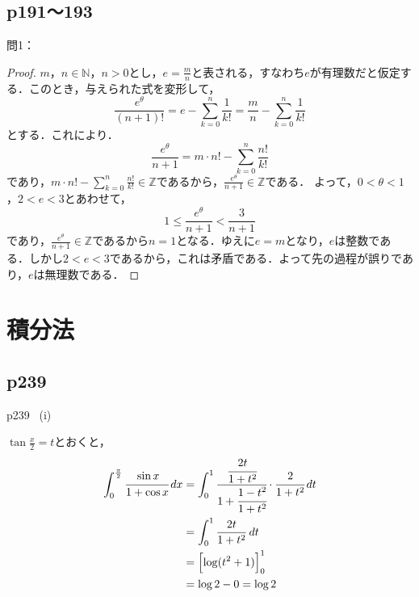 \documentclass[dvipdfmx,uplatex,11pt]{jsarticle}
\theoremstyle{definition}
\begin{document}
\subsection{p191〜193}
%
問1：
\begin{leftbar}
    \begin{proof}
        $m，n \in \mathbb{N}$，$n >0$とし，$e=\frac{m}{n}$と表される，すなわち$e$が有理数だと仮定する．このとき，与えられた式を変形して，
        \[
            \frac{e^\theta}{(n+1)!} = e-\sum_{k=0}^{n} \frac{1}{k!} =\frac{m}{n}-\sum_{k=0}^{n} \frac{1}{k!}
        \]
        とする．これにより．
        \[
            \frac{e^{\theta}}{n+1} = m \cdot n! - \sum_{k=0}^{n} \frac{n!}{k!}
        \]
        であり，$m \cdot n! - \sum_{k=0}^{n} \frac{n!}{k!} \in \mathbb{Z}$であるから，$\frac{e^{\theta}}{n+1} \in \mathbb{Z}$である．
        よって，$0< \theta <1$，$2<e<3$とあわせて，
        \[
            1 \le \frac{e^{\theta}}{n+1} < \frac{3}{n+1}
        \]
        であり，$\frac{e^{\theta}}{n+1} \in \mathbb{Z}$であるから$n=1$となる．ゆえに$e=m$となり，$e$は整数である．しかし$2<e<3$であるから，これは矛盾である．よって先の過程が誤りであり，$e$は無理数である．
    \end{proof}
\end{leftbar}
\newpage

\section{積分法}


\subsection{p239}

\begin{screen}
	p239 \, (i) \par 
	 $\tan \frac{x}{2}=t$とおくと，
	\begin{align*}
		\int_{0}^{\frac{\pi}{2}} \cfrac{\sin x}{1+\cos x} \, dx & = \int_{0}^{1} \cfrac{\cfrac{2t}{1+t^2}}{1+\cfrac{1-t^2}{1+t^2}} \cdot \cfrac{2}{1+t^2} \, dt \\
		& = \int_{0}^{1} \frac{2t}{1+t^2} \, dt \\
		& = \Bigl[\log (t^2+1)\Bigl]_{0}^{1} \\
		& = \log 2-0 = \log 2
	\end{align*}
\end{screen}
\end{document}
